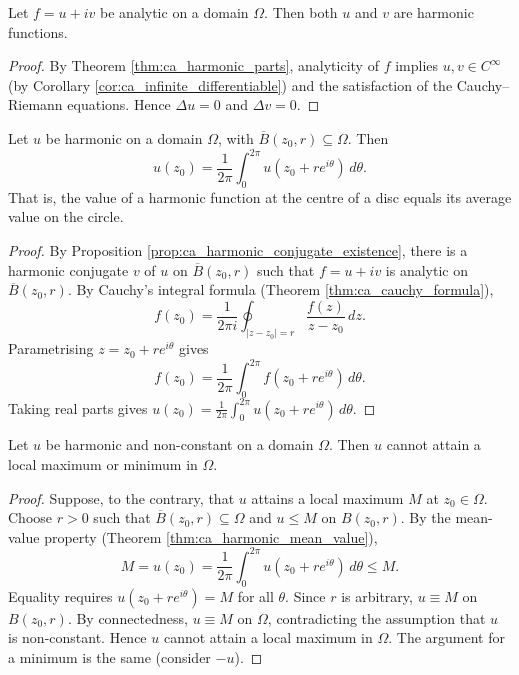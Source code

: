 \begin{theorem}\label{thm:ca_analytic_implies_harmonic}
Let $f = u + iv$ be analytic on a domain $\Omega$. Then both $u$ and $v$ are harmonic functions.
\end{theorem}

\begin{proof}
By Theorem \ref{thm:ca_harmonic_parts}, analyticity of $f$ implies $u, v \in C^\infty$ (by Corollary \ref{cor:ca_infinite_differentiable}) and the satisfaction of the Cauchy--Riemann equations. Hence $\Delta u = 0$ and $\Delta v = 0$.
\end{proof}

\begin{theorem}\label{thm:ca_harmonic_mean_value}
Let $u$ be harmonic on a domain $\Omega$, with $\overline{B}(z_0, r) \subseteq \Omega$. Then
\[
u(z_0) = \frac{1}{2\pi} \int_0^{2\pi} u(z_0 + re^{i\theta}) \, d\theta.
\]
That is, the value of a harmonic function at the centre of a disc equals its average value on the circle.
\end{theorem}

\begin{proof}
By Proposition \ref{prop:ca_harmonic_conjugate_existence}, there is a harmonic conjugate $v$ of $u$ on $\overline{B}(z_0, r)$ such that $f = u + iv$ is analytic on $\overline{B}(z_0, r)$. By Cauchy's integral formula (Theorem \ref{thm:ca_cauchy_formula}),
\[
f(z_0) = \frac{1}{2\pi i} \oint_{|z - z_0| = r} \frac{f(z)}{z - z_0} \, dz.
\]
Parametrising $z = z_0 + re^{i\theta}$ gives
\[
f(z_0) = \frac{1}{2\pi} \int_0^{2\pi} f(z_0 + re^{i\theta}) \, d\theta.
\]
Taking real parts gives $u(z_0) = \frac{1}{2\pi} \int_0^{2\pi} u(z_0 + re^{i\theta}) \, d\theta$.
\end{proof}

\begin{corollary}\label{cor:ca_harmonic_max_principle}
Let $u$ be harmonic and non-constant on a domain $\Omega$. Then $u$ cannot attain a local maximum or minimum in $\Omega$.
\end{corollary}

\begin{proof}
Suppose, to the contrary, that $u$ attains a local maximum $M$ at $z_0 \in \Omega$. Choose $r > 0$ such that $\overline{B}(z_0, r) \subseteq \Omega$ and $u \le M$ on $B(z_0, r)$. By the mean-value property (Theorem \ref{thm:ca_harmonic_mean_value}),
\[
M = u(z_0) = \frac{1}{2\pi} \int_0^{2\pi} u(z_0 + re^{i\theta}) \, d\theta \le M.
\]
Equality requires $u(z_0 + re^{i\theta}) = M$ for all $\theta$. Since $r$ is arbitrary, $u \equiv M$ on $B(z_0, r)$. By connectedness, $u \equiv M$ on $\Omega$, contradicting the assumption that $u$ is non-constant. Hence $u$ cannot attain a local maximum in $\Omega$. The argument for a minimum is the same (consider $-u$).
\end{proof}


